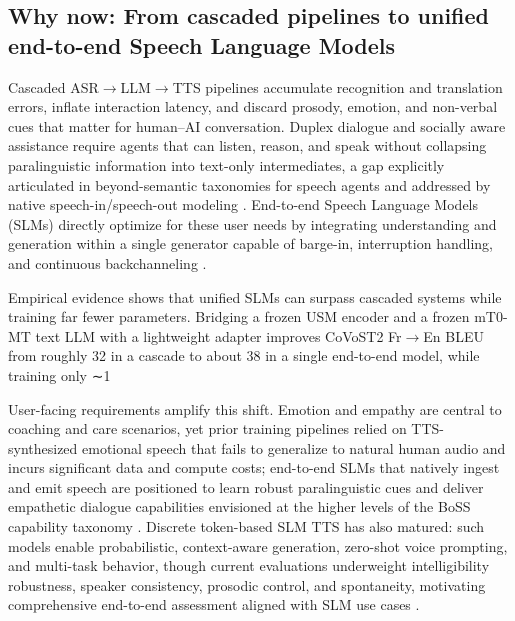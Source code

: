\documentclass{article}
\begin{document}

\subsection{Why now: From cascaded pipelines to unified end-to-end Speech Language Models} \label{subsec:whynow:fromcascadedpipelinestounifiedend-to-endspeechlanguagemodels}

Cascaded ASR$\rightarrow$LLM$\rightarrow$TTS pipelines accumulate recognition and translation errors, inflate interaction latency, and discard prosody, emotion, and non-verbal cues that matter for human--AI conversation. Duplex dialogue and socially aware assistance require agents that can listen, reason, and speak without collapsing paralinguistic information into text-only intermediates, a gap explicitly articulated in beyond-semantic taxonomies for speech agents and addressed by native speech-in/speech-out modeling . End-to-end Speech Language Models (SLMs) directly optimize for these user needs by integrating understanding and generation within a single generator capable of barge-in, interruption handling, and continuous backchanneling \cite{ma2024languagemodelcanlistenwhilespeaking}.



Empirical evidence shows that unified SLMs can surpass cascaded systems while training far fewer parameters. Bridging a frozen USM encoder and a frozen mT0-MT text LLM with a lightweight adapter improves CoVoST2 Fr$\rightarrow$En BLEU from roughly 32 in a cascade to about 38 in a single end-to-end model, while training only ∼1%



User-facing requirements amplify this shift. Emotion and empathy are central to coaching and care scenarios, yet prior training pipelines relied on TTS-synthesized emotional speech that fails to generalize to natural human audio and incurs significant data and compute costs; end-to-end SLMs that natively ingest and emit speech are positioned to learn robust paralinguistic cues and deliver empathetic dialogue capabilities envisioned at the higher levels of the BoSS capability taxonomy . Discrete token-based SLM TTS has also matured: such models enable probabilistic, context-aware generation, zero-shot voice prompting, and multi-task behavior, though current evaluations underweight intelligibility robustness, speaker consistency, prosodic control, and spontaneity, motivating comprehensive end-to-end assessment aligned with SLM use cases \cite{wang2024evaluatingtextspeechsynthesislargediscre}.
\end{document}
